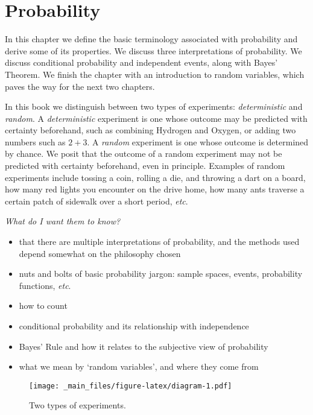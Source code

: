 \documentclass[]{book}
\providecommand{\tightlist}{%
  \setlength{\itemsep}{0pt}\setlength{\parskip}{0pt}}
\numberwithin{equation}{chapter}
\numberwithin{figure}{chapter}
\theoremstyle{plain}
\theoremstyle{definition}
\theoremstyle{remark}
\theoremstyle{definition}
\theoremstyle{definition}
\theoremstyle{remark}
\begin{document}
\chapter{Probability}\label{cha-probability}

In this chapter we define the basic terminology associated with
probability and derive some of its properties. We discuss three
interpretations of probability. We discuss conditional probability and
independent events, along with Bayes' Theorem. We finish the chapter
with an introduction to random variables, which paves the way for the
next two chapters.

In this book we distinguish between two types of experiments:
\emph{deterministic} and \emph{random}. A \emph{deterministic}
experiment is one whose outcome may be predicted with certainty
beforehand, such as combining Hydrogen and Oxygen, or adding two numbers
such as \(2+3\). A \emph{random} experiment is one whose outcome is
determined by chance. We posit that the outcome of a random experiment
may not be predicted with certainty beforehand, even in principle.
Examples of random experiments include tossing a coin, rolling a die,
and throwing a dart on a board, how many red lights you encounter on the
drive home, how many ants traverse a certain patch of sidewalk over a
short period, \emph{etc}.

\emph{What do I want them to know?}

\begin{itemize}
\tightlist
\item
  that there are multiple interpretations of probability, and the
  methods used depend somewhat on the philosophy chosen
\item
  nuts and bolts of basic probability jargon: sample spaces, events,
  probability functions, \emph{etc}.
\item
  how to count
\item
  conditional probability and its relationship with independence
\item
  Bayes' Rule and how it relates to the subjective view of probability
\item
  what we mean by `random variables', and where they come from
\end{itemize}

\begin{figure}[htbp]
\centering
\texttt{[image: \_main\_files/figure-latex/diagram-1.pdf]}
\caption{\label{fig:diagram}\small Two types of experiments.}
\end{figure}
\end{document}
